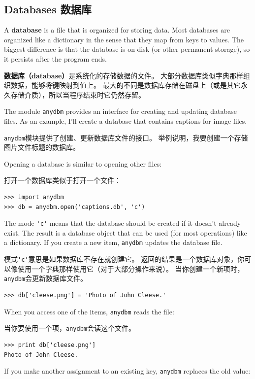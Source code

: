 \documentclass[10pt]{book}
\begin{document}
\begin{CJK}{UTF8}{gbsn}
\section{Databases 数据库}

A {\bf database} is a file that is organized for storing data.
Most databases are organized like a dictionary in the sense
that they map from keys to values.  The biggest difference
is that the database is on disk (or other permanent storage),
so it persists after the program ends.

{\bf 数据库（database）}是系统化的存储数据的文件。
大部分数据库类似字典那样组织数据，能够将键映射到值上。
最大的不同是数据库存储在磁盘上（或是其它永久存储介质），所以当程序结束时它仍然存留。

The module {\tt anydbm} provides an interface for creating
and updating database files.  As an example, I'll create a database
that contains captions for image files.

{\tt anydbm}模块提供了创建、更新数据库文件的接口。
举例说明，我要创建一个存储图片文件标题的数据库。

Opening a database is similar to opening other files:

打开一个数据库类似于打开一个文件：

\begin{verbatim}
>>> import anydbm
>>> db = anydbm.open('captions.db', 'c')
\end{verbatim}
%
The mode \verb"'c'" means that the database should be created if
it doesn't already exist.  The result is a database object
that can be used (for most operations) like a dictionary.
If you create a new item, {\tt anydbm} updates the database file.

模式\verb"'c'"意思是如果数据库不存在就创建它。
返回的结果是一个数据库对象，你可以像使用一个字典那样使用它（对于大部分操作来说）。
当你创建一个新项时，{\tt anydbm}会更新数据库文件。

\begin{verbatim}
>>> db['cleese.png'] = 'Photo of John Cleese.'
\end{verbatim}
%
When you access one of the items, {\tt anydbm} reads the file:

当你要使用一个项，{\tt anydbm}会读这个文件。

\begin{verbatim}
>>> print db['cleese.png']
Photo of John Cleese.
\end{verbatim}
%
If you make another assignment to an existing key, {\tt anydbm} replaces
the old value:


\end{CJK}
\end{document}
